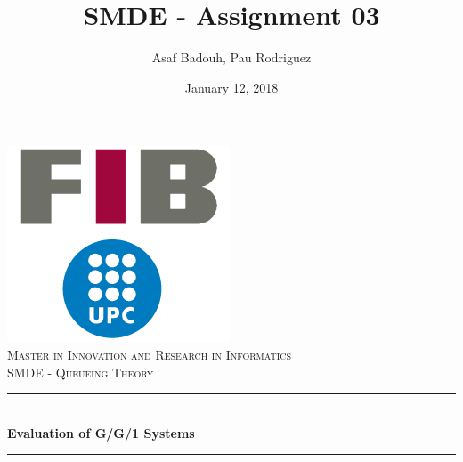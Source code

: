 \documentclass[]{article}
\title{SMDE - Assignment 03}
\author{Asaf Badouh, Pau Rodriguez}
\date{January 12, 2018}
\begin{document}
\begin{titlepage}

\newcommand{\HRule}{\rule{\linewidth}{0.5mm}}               %
\newenvironment{bottompar}{\par\vspace*{\fill}}{\clearpage}
\center 
\begin{center}


\includegraphics{figures/fib-upc-v2-transparent.png}\\[2cm] %
 
\textsc{\Large Master in Innovation and Research in Informatics}\\[0.5cm] %
\textsc{\large SMDE - Queueing Theory}\\[3cm] %


\HRule \\[0.4cm]
{ \huge \bfseries Evaluation of G/G/1 Systems}\\[0.4cm] %
\HRule \\[1.5cm]
 

\end{center}
\end{titlepage}
\end{document}
